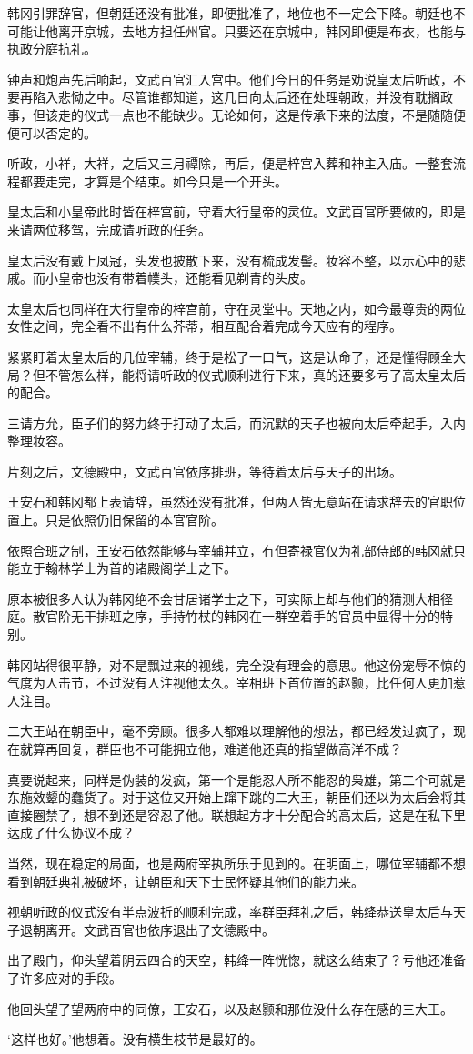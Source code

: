 韩冈引罪辞官，但朝廷还没有批准，即便批准了，地位也不一定会下降。朝廷也不可能让他离开京城，去地方担任州官。只要还在京城中，韩冈即便是布衣，也能与执政分庭抗礼。

钟声和炮声先后响起，文武百官汇入宫中。他们今日的任务是劝说皇太后听政，不要再陷入悲恸之中。尽管谁都知道，这几日向太后还在处理朝政，并没有耽搁政事，但该走的仪式一点也不能缺少。无论如何，这是传承下来的法度，不是随随便便可以否定的。

听政，小祥，大祥，之后又三月禫除，再后，便是梓宫入葬和神主入庙。一整套流程都要走完，才算是个结束。如今只是一个开头。

皇太后和小皇帝此时皆在梓宫前，守着大行皇帝的灵位。文武百官所要做的，即是来请两位移驾，完成请听政的任务。

皇太后没有戴上凤冠，头发也披散下来，没有梳成发髻。妆容不整，以示心中的悲戚。而小皇帝也没有带着幞头，还能看见剃青的头皮。

太皇太后也同样在大行皇帝的梓宫前，守在灵堂中。天地之内，如今最尊贵的两位女性之间，完全看不出有什么芥蒂，相互配合着完成今天应有的程序。

紧紧盯着太皇太后的几位宰辅，终于是松了一口气，这是认命了，还是懂得顾全大局？但不管怎么样，能将请听政的仪式顺利进行下来，真的还要多亏了高太皇太后的配合。

三请方允，臣子们的努力终于打动了太后，而沉默的天子也被向太后牵起手，入内整理妆容。

片刻之后，文德殿中，文武百官依序排班，等待着太后与天子的出场。

王安石和韩冈都上表请辞，虽然还没有批准，但两人皆无意站在请求辞去的官职位置上。只是依照仍旧保留的本官官阶。

依照合班之制，王安石依然能够与宰辅并立，冇但寄禄官仅为礼部侍郎的韩冈就只能立于翰林学士为首的诸殿阁学士之下。

原本被很多人认为韩冈绝不会甘居诸学士之下，可实际上却与他们的猜测大相径庭。散官阶无干排班之序，手持竹杖的韩冈在一群空着手的官员中显得十分的特别。

韩冈站得很平静，对不是飘过来的视线，完全没有理会的意思。他这份宠辱不惊的气度为人击节，不过没有人注视他太久。宰相班下首位置的赵颢，比任何人更加惹人注目。

二大王站在朝臣中，毫不旁顾。很多人都难以理解他的想法，都已经发过疯了，现在就算再回复，群臣也不可能拥立他，难道他还真的指望做高洋不成？

真要说起来，同样是伪装的发疯，第一个是能忍人所不能忍的枭雄，第二个可就是东施效颦的蠢货了。对于这位又开始上蹿下跳的二大王，朝臣们还以为太后会将其直接圈禁了，想不到还是容忍了他。联想起方才十分配合的高太后，这是在私下里达成了什么协议不成？

当然，现在稳定的局面，也是两府宰执所乐于见到的。在明面上，哪位宰辅都不想看到朝廷典礼被破坏，让朝臣和天下士民怀疑其他们的能力来。

视朝听政的仪式没有半点波折的顺利完成，率群臣拜礼之后，韩绛恭送皇太后与天子退朝离开。文武百官也依序退出了文德殿中。

出了殿门，仰头望着阴云四合的天空，韩绛一阵恍惚，就这么结束了？亏他还准备了许多应对的手段。

他回头望了望两府中的同僚，王安石，以及赵颢和那位没什么存在感的三大王。

‘这样也好。’他想着。没有横生枝节是最好的。

